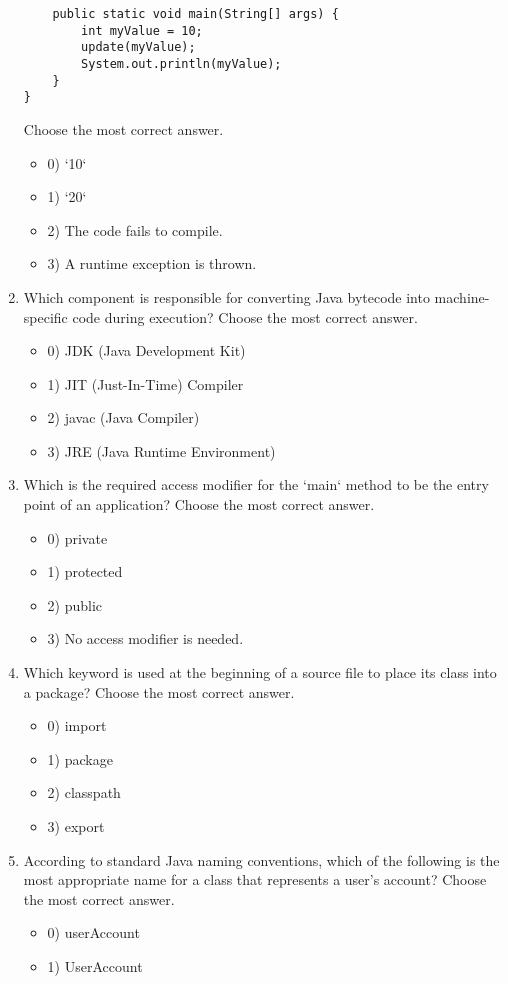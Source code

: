 \documentclass[12pt]{article}
\begin{document}
\begin{enumerate}[label=(\arabic*)]
\begin{verbatim}
    public static void main(String[] args) {
        int myValue = 10;
        update(myValue);
        System.out.println(myValue);
    }
}
\end{verbatim}
Choose the most correct answer. 
\begin{itemize}
\item 0) `10`
\item 1) `20`
\item 2) The code fails to compile.
\item 3) A runtime exception is thrown.
\end{itemize}
\item Which component is responsible for converting Java bytecode into machine-specific code during execution?
Choose the most correct answer. 
\begin{itemize}
\item 0) JDK (Java Development Kit)
\item 1) JIT (Just-In-Time) Compiler
\item 2) javac (Java Compiler)
\item 3) JRE (Java Runtime Environment)
\end{itemize}
\item Which is the required access modifier for the `main` method to be the entry point of an application?
Choose the most correct answer. 
\begin{itemize}
\item 0) private
\item 1) protected
\item 2) public
\item 3) No access modifier is needed.
\end{itemize}
\item Which keyword is used at the beginning of a source file to place its class into a package?
Choose the most correct answer. 
\begin{itemize}
\item 0) import
\item 1) package
\item 2) classpath
\item 3) export
\end{itemize}
\item According to standard Java naming conventions, which of the following is the most appropriate name for a class that represents a user's account?
Choose the most correct answer. 
\begin{itemize}
\item 0) userAccount
\item 1) UserAccount

\end{itemize}
\end{enumerate}
\end{document}

